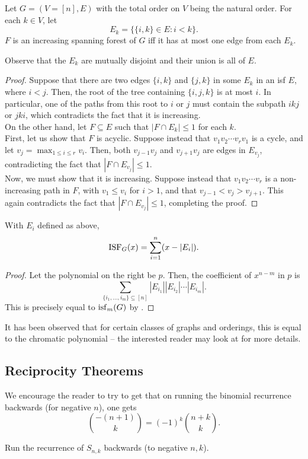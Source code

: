 	\begin{flem}
		\label{lemma: isf}
		Let $G = (V=[n],E)$ with the total order on $V$ being the natural order. For each $k \in V$, let
		\[ E_k = \{ \{i,k\} \in E : i<k \}. \]
		$F$ is an increasing spanning forest of $G$ iff it has at most one edge from each $E_k$. 
	\end{flem}
	Observe that the $E_k$ are mutually disjoint and their union is all of $E$.
	\begin{proof}
		Suppose that there are two edges $\{i,k\}$ and $\{j,k\}$ in some $E_k$ in an isf $E$, where $i<j$. Then, the root of the tree containing $\{i,j,k\}$ is at most $i$. In particular, one of the paths from this root to $i$ or $j$ must contain the subpath $ikj$ or $jki$, which contradicts the fact that it is increasing.\\
		
		On the other hand, let $F \subseteq E$ such that $|F \cap E_k| \le 1$ for each $k$.\\
		First, let us show that $F$ is acyclic. Suppose instead that $v_1v_2\cdots v_rv_1$ is a cycle, and let $v_j = \max_{1 \le i \le r} v_i$. Then, both $v_{j-1}v_j$ and $v_{j+1}v_j$ are edges in $E_{v_j}$, contradicting the fact that $|F \cap E_{v_j}| \le 1$.\\
		Now, we must show that it is increasing. Suppose instead that $v_1v_2\cdots v_r$ is a non-increasing path in $F$, with $v_1 \le v_i$ for $i > 1$, and that $v_{j-1} < v_j > v_{j+1}$. This again contradicts the fact that $|F \cap E_{v_j}| \le 1$, completing the proof.
	\end{proof}

	\begin{ftheo}
		\label{theo: isf}
		With $E_i$ defined as above,
		\[ \operatorname{ISF}_G(x) = \sum_{i=1}^n (x-|E_i|). \]
	\end{ftheo}
	\begin{proof}
		Let the polynomial on the right be $p$. Then, the coefficient of $x^{n-m}$ in $p$ is
		\[ \sum_{\{i_1,\ldots,i_m\} \subseteq [n]} |E_{i_1}| |E_{i_2}| \cdots |E_{i_m}|. \]
		This is precisely equal to $\operatorname{isf}_m(G)$ by .
	\end{proof}

	It has been observed that for certain classes of graphs and orderings, this is equal to the chromatic polynomial -- the interested reader may look at \cite{sagan} for more details.

\subsection{Reciprocity Theorems}
\label{reciprocity theorems}

	We encourage the reader to try  to get that on running the binomial recurrence backwards (for negative $n$), one gets
	\[ \binom{-(n+1)}{k} = (-1)^k \binom{n+k}{k}. \]

	\begin{exercise}
		Run the recurrence of $S_{n,k}$ backwards (to negative $n,k$).
	\end{exercise}
